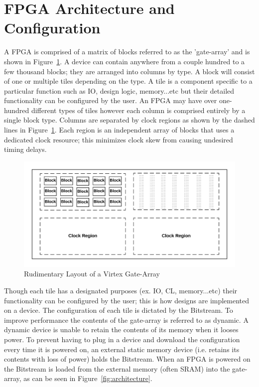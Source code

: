 \section{FPGA Architecture and Configuration} \label{sec:architectureAndConfig}
A \Xilinx \acrfull{FPGA} is comprised of a matrix of blocks referred to as the 'gate-array' and is shown in Figure~\ref{fig:FPGA}.
A device can contain anywhere from a couple hundred to a few thousand blocks; they are arranged into columns by type.
A block will consist of one or multiple tiles depending on the type.
A tile is a component specific to a particular function such as \acrfull{IO}, design logic, memory...etc but their detailed functionality can be configured by the user.
An \acrshort{FPGA} may have over one-hundred different types of tiles however each column is comprised entirely by a single block type.
Columns are separated by clock regions as shown by the dashed lines in Figure~\ref{fig:FPGA}.
Each region is an independent array of blocks that uses a dedicated clock resource; this minimizes clock skew from causing undesired timing delays.
\begin{figure}[h]
	\centering
	\includegraphics[width=1\linewidth]{figures/FPGA}
	\caption[Rudimentary Layout of a Virtex Gate-Array]{Rudimentary Layout of a Virtex Gate-Array}
	\label{fig:FPGA}
\end{figure}
Though each tile has a designated purposes (ex. \acrfull{IO}, \acrfull{CL}, memory...etc) their functionality can be configured by the user; this is how designs are implemented on a device.
The configuration of each tile is dictated by the \gls{Bitstream}. 
To improve performance the contents of the gate-array is referred to as dynamic.
A dynamic device is unable to retain the contents of its memory when it looses power.
To prevent having to plug in a device and download the configuration every time it is powered on, an external static memory device (i.e. retains its contents with loss of power) holds the \gls{Bitstream}. 
When an \acrshort{FPGA} is powered on the \gls{Bitstream} is loaded from the external memory (often \acrfull{SRAM}) into the gate-array, as can be seen in Figure~\ref{fig:architecture}.

